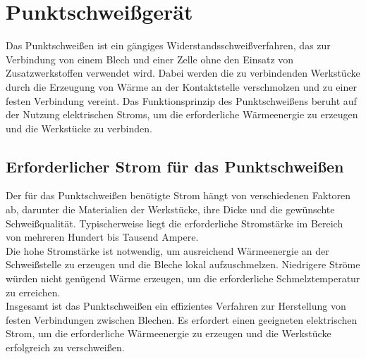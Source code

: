 


\section{Punktschweißgerät}

Das Punktschweißen ist ein gängiges Widerstandsschweißverfahren, das zur Verbindung von einem Blech und einer Zelle ohne den Einsatz von Zusatzwerkstoffen verwendet wird.
Dabei werden die zu verbindenden Werkstücke durch die Erzeugung von Wärme an der Kontaktstelle verschmolzen und zu einer festen Verbindung vereint.
Das Funktionsprinzip des Punktschweißens beruht auf der Nutzung elektrischen Stroms, um die erforderliche Wärmeenergie zu erzeugen und die Werkstücke zu verbinden.



\subsection{Erforderlicher Strom für das Punktschweißen}

Der für das Punktschweißen benötigte Strom hängt von verschiedenen Faktoren ab, darunter die Materialien der Werkstücke, ihre Dicke und die gewünschte Schweißqualität.
Typischerweise liegt die erforderliche Stromstärke im Bereich von mehreren Hundert bis Tausend Ampere.\\

Die hohe Stromstärke ist notwendig, um ausreichend Wärmeenergie an der Schweißstelle zu erzeugen und die Bleche lokal aufzuschmelzen.
Niedrigere Ströme würden nicht genügend Wärme erzeugen, um die erforderliche Schmelztemperatur zu erreichen.\\

Insgesamt ist das Punktschweißen ein effizientes Verfahren zur Herstellung von festen Verbindungen zwischen Blechen.
Es erfordert einen geeigneten elektrischen Strom, um die erforderliche Wärmeenergie zu erzeugen und die Werkstücke erfolgreich zu verschweißen.\\

